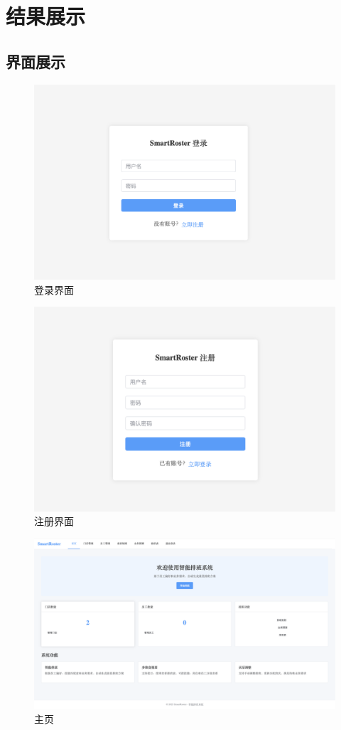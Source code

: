 \documentclass{ctexart}
\begin{document}
\section{结果展示}
\subsection{界面展示}
\begin{figure}[H]
    \centering
    \includegraphics[width=0.8\linewidth]{./source/登录界面.png}
    \caption{登录界面}
    \label{fig:microservice-arch}
\end{figure}
\begin{figure}[H]
    \centering
    \includegraphics[width=0.8\linewidth]{./source/注册界面.png}
    \caption{注册界面}
    \label{fig:microservice-arch}
\end{figure}
\begin{figure}[H]
    \centering
    \includegraphics[width=0.8\linewidth]{./source/主页.png}
    \caption{主页}
    \label{fig:microservice-arch}
\end{figure}
\end{document}
